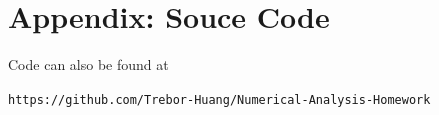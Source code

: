 \documentclass{homework}
\begin{document}
\newpage
\section*{Appendix: Souce Code}
Code can also be found at 
\begin{center}
\texttt{https://github.com/Trebor-Huang/Numerical-Analysis-Homework}
\end{center}
\end{document}
